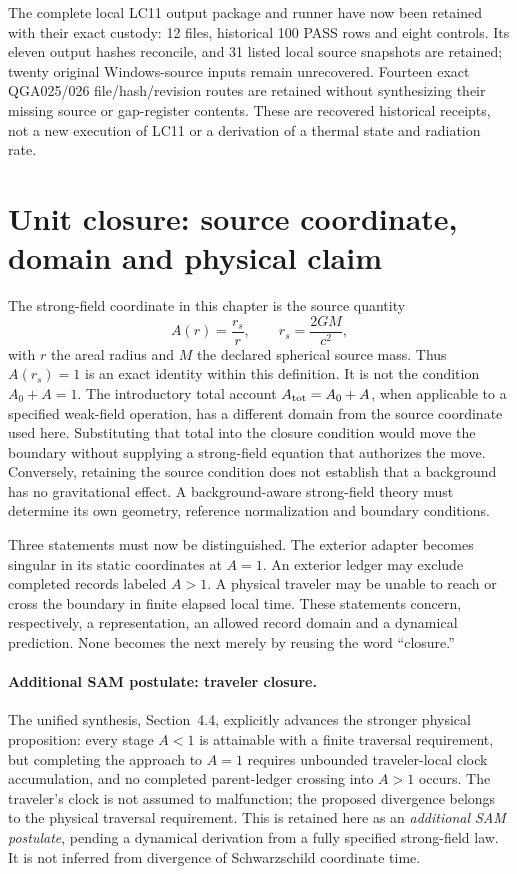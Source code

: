\documentclass[10pt,twocolumn,letterpaper]{article}
\begin{document}
The complete local LC11 output package and runner have now been retained
with their exact custody: 12 files, historical 100 PASS rows and eight
controls. Its eleven output hashes reconcile, and 31 listed local source
snapshots are retained; twenty original Windows-source inputs remain
unrecovered. Fourteen exact QGA025/026 file/hash/revision routes are retained
without synthesizing their missing source or gap-register contents.
These are recovered historical receipts, not a new execution of LC11 or
a derivation of a thermal state and radiation rate.


\section{Unit closure: source coordinate, domain and physical claim}
\label{sec:unit-closure}
The strong-field coordinate in this chapter is the source quantity
\[
 A(r)=\frac{r_s}{r},\qquad r_s=\frac{2GM}{c^2},
\]
with $r$ the areal radius and $M$ the declared spherical source mass. Thus $A(r_s)=1$ is an exact identity within this definition. It is not the condition $A_0+A=1$. The introductory total account $A_{\rm tot}=A_0+A$, when applicable to a specified weak-field operation, has a different domain from the source coordinate used here. Substituting that total into the closure condition would move the boundary without supplying a strong-field equation that authorizes the move. Conversely, retaining the source condition does not establish that a background has no gravitational effect. A background-aware strong-field theory must determine its own geometry, reference normalization and boundary conditions.

Three statements must now be distinguished. The exterior adapter becomes singular in its static coordinates at $A=1$. An exterior ledger may exclude completed records labeled $A>1$. A physical traveler may be unable to reach or cross the boundary in finite elapsed local time. These statements concern, respectively, a representation, an allowed record domain and a dynamical prediction. None becomes the next merely by reusing the word ``closure.''

\paragraph{Additional SAM postulate: traveler closure.}
The unified synthesis, Section~4.4, explicitly advances the stronger physical proposition: every stage $A<1$ is attainable with a finite traversal requirement, but completing the approach to $A=1$ requires unbounded traveler-local clock accumulation, and no completed parent-ledger crossing into $A>1$ occurs. The traveler's clock is not assumed to malfunction; the proposed divergence belongs to the physical traversal requirement. This is retained here as an \emph{additional SAM postulate}, pending a dynamical derivation from a fully specified strong-field law. It is not inferred from divergence of Schwarzschild coordinate time.
\end{document}
